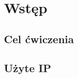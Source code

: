 \section{Wstęp}
\subsection{Cel ćwiczenia}


\subsection{Użyte IP}

\begin{enumerate}
\end{enumerate}

